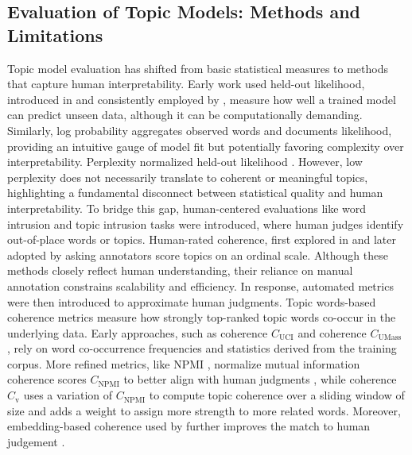 \subsection{Evaluation of Topic Models: Methods and Limitations}
Topic model evaluation has shifted from basic statistical measures to methods that capture human interpretability. Early work used held-out likelihood, introduced in \cite{blei2003LDA} 
and consistently employed by  
\cite{blei2007CTM},
measure how well a trained model can predict unseen data, although it can be computationally demanding. Similarly, log probability 
\cite{newman2009distributed} 
aggregates observed words and documents likelihood, providing an intuitive gauge of model fit but potentially favoring complexity over interpretability. Perplexity normalized held-out likelihood \cite{blei2003LDA, blei2007CTM, wang2008cDTM, newman2009distributed, Hinton2009UndirectedTM, srivastava2017ProdLDA-AVITM, ding2018coherenceNTM, card2018SCHOLAR, Zhang2018WHAI, dieng2020ETM}.
However, low perplexity does not necessarily translate to coherent or meaningful topics\cite{chang2009HumanTeaLeaves}, 
highlighting a fundamental disconnect between statistical quality and human interpretability.
To bridge this gap, human-centered evaluations like word intrusion and topic intrusion tasks \cite{chang2009HumanTeaLeaves}
were introduced, where human judges identify out-of-place words or topics. Human-rated coherence, first explored in
\cite{newman2010automaticHuman} 
and later adopted by 
\cite{mimno2011optimizing, aletras2013TC, stammbach2023revisitingLLM} 
asking annotators score topics on an ordinal scale. Although these methods closely reflect human understanding, their reliance on manual annotation constrains scalability and efficiency.
In response, automated metrics were then introduced to approximate human judgments. Topic words-based coherence metrics measure how strongly top-ranked topic words co-occur in the underlying data. Early approaches, such as coherence $C_{\text{UCI}}$ \cite{Newman2010TMforDL}
and coherence $C_{\text{UMass}}$ \cite{mimno2011optimizing},
rely on word co-occurrence frequencies and statistics derived from the training corpus. More refined metrics, like NPMI \cite{bouma2009NPMI}, normalize mutual information coherence scores $C_{\text{NPMI}}$ to better align with human judgments \cite{aletras2013TC, lau2014machineTeaLeaves, srivastava2017ProdLDA-AVITM, ding2018coherenceNTM, card2018SCHOLAR, wang2019ATM, wang2020BAT, grootendorst2022bertopic, wu2023ECRTM},
while coherence $C_{\text{v}}$ \cite{roder2015CV} 
uses a variation of $C_{\text{NPMI}}$ to compute topic coherence over a sliding window of size and adds a weight to assign more strength to more related words. Moreover, embedding-based coherence used by \cite{schnabel2015EmbeddingEvalTM, Nikolenko2016EmbeddingEvalTM, ding2018coherenceNTM, bianchi2021CombinedTM} further improves the match to human judgement \cite{Nikolenko2016EmbeddingEvalTM}.
